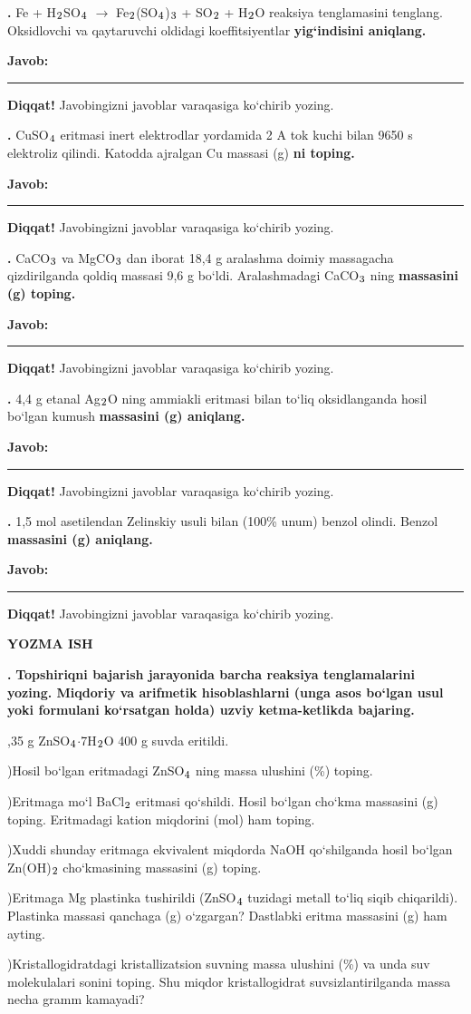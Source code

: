 \documentclass[11pt,a4paper]{article}
\renewcommand{\textsubscript}[1]{\ensuremath{_{\text{\fontsize{8}{8}\selectfont #1}}}}
\newcommand{\qn}[1]{\textbf{\fontsize{11.5}{13}\selectfont #1}}
\newcommand{\qsep}{\par\vspace{1pt}\noindent\rule{0pt}{0.4pt}\par\vspace{5pt}}
\newcommand{\javob}{\par\smallskip\noindent\textbf{Javob:} \rule[-2pt]{7.5cm}{0.4pt}\par\smallskip\noindent\textbf{Diqqat!} Javobingizni javoblar varaqasiga ko`chirib yozing.\par\medskip}
\begin{document}
\par\bigskip
\noindent\qn{36.} Fe + H\textsubscript{2}SO\textsubscript{4} $\to$ Fe\textsubscript{2}(SO\textsubscript{4})\textsubscript{3} + SO\textsubscript{2} + H\textsubscript{2}O reaksiya tenglamasini tenglang. Oksidlovchi va qaytaruvchi oldidagi koeffitsiyentlar \textbf{yig`indisini aniqlang.}
\javob\qsep
\noindent\qn{37.} CuSO\textsubscript{4} eritmasi inert elektrodlar yordamida 2 A tok kuchi bilan 9650 s elektroliz qilindi. Katodda ajralgan Cu massasi (g) \textbf{ni toping.}
\javob\qsep
\noindent\qn{38.} CaCO\textsubscript{3} va MgCO\textsubscript{3} dan iborat 18,4 g aralashma doimiy massagacha qizdirilganda qoldiq massasi 9,6 g bo`ldi. Aralashmadagi CaCO\textsubscript{3} ning \textbf{massasini (g) toping.}
\javob\qsep
\noindent\qn{39.} 4,4 g etanal Ag\textsubscript{2}O ning ammiakli eritmasi bilan to`liq oksidlanganda hosil bo`lgan kumush \textbf{massasini (g) aniqlang.}
\javob\qsep
\noindent\qn{40.} 1,5 mol asetilendan Zelinskiy usuli bilan (100\% unum) benzol olindi. Benzol \textbf{massasini (g) aniqlang.}
\javob\qsep
\par\bigskip\begin{center}\textbf{\fontsize{13}{15}\selectfont YOZMA ISH}\end{center}
\noindent\qn{41.} \textbf{Topshiriqni bajarish jarayonida barcha reaksiya tenglamalarini yozing. Miqdoriy va arifmetik hisoblashlarni (unga asos bo`lgan usul yoki formulani ko`rsatgan holda) uzviy ketma-ketlikda bajaring.}\par{},35 g ZnSO\textsubscript{4}$\cdot$7H\textsubscript{2}O 400 g suvda eritildi.\par
{})Hosil bo`lgan eritmadagi ZnSO\textsubscript{4} ning massa ulushini (\%) toping.\par
{})Eritmaga mo`l BaCl\textsubscript{2} eritmasi qo`shildi. Hosil bo`lgan cho`kma massasini (g) toping. Eritmadagi kation miqdorini (mol) ham toping.\par
{})Xuddi shunday eritmaga ekvivalent miqdorda NaOH qo`shilganda hosil bo`lgan Zn(OH)\textsubscript{2} cho`kmasining massasini (g) toping.\par
{})Eritmaga Mg plastinka tushirildi (ZnSO\textsubscript{4} tuzidagi metall to`liq siqib chiqarildi). Plastinka massasi qanchaga (g) o`zgargan? Dastlabki eritma massasini (g) ham ayting.\par
{})Kristallogidratdagi kristallizatsion suvning massa ulushini (\%) va unda suv molekulalari sonini toping. Shu miqdor kristallogidrat suvsizlantirilganda massa necha gramm kamayadi?\par
\end{document}
